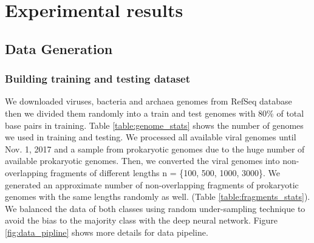 
\chapter{Experimental results} %

\label{Chapter4} %



\section{Data Generation}

\subsection{Building training and testing dataset}
We downloaded viruses, bacteria and archaea genomes from RefSeq database then we divided them randomly into a train and test genomes with 80\% of total base pairs in training. Table \ref{table:genome_stats} shows the number of genomes we used in training and testing. We processed all available viral genomes until Nov. 1, 2017 and a sample from prokaryotic genomes due to the huge number of available prokaryotic genomes. Then, we converted the viral genomes into non-overlapping fragments of different lengths n = \{100, 500, 1000, 3000\}. We generated an approximate number of non-overlapping fragments of prokaryotic genomes with the same lengths randomly as well. (Table \ref{table:fragments_stats}). We balanced the data of both classes using random under-sampling technique to avoid the bias to the majority class with the deep neural network. Figure \ref{fig:data_pipline} shows more details for data pipeline.


